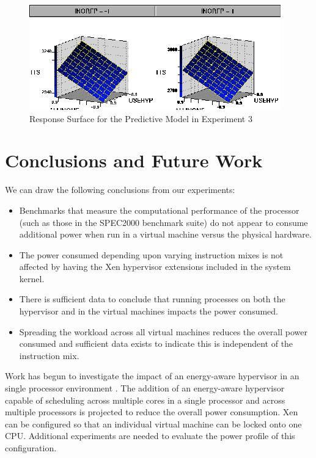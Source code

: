 \documentclass[preprint]{sigplanconf}
\begin{document}
\begin{figure}
  \centering
  \begin{center}
    \includegraphics[scale=2.0]{graphics/surfaceplot.eps}
  \end{center}
  \caption{Response Surface for the Predictive Model in Experiment 3}
  \label{fig:RSM3}
\end{figure}

\section{Conclusions and Future Work}
\label{sec:Conclusions}

We can draw the following conclusions from our experiments:
\begin{itemize}
\item Benchmarks that measure the computational performance of the processor
  (such as those in the SPEC2000 benchmark suite) do not appear to consume
  additional power when run in a virtual machine versus the physical hardware.
\item The power consumed depending upon varying instruction mixes is not
  affected by having the Xen hypervisor extensions included in the system kernel.
\item There is sufficient data to conclude that running processes on both the
  hypervisor and in the virtual machines impacts the power consumed.
\item Spreading the workload across all virtual machines reduces the overall
  power consumed and sufficient data exists to indicate this is independent of
  the instruction mix.
\end{itemize}

Work has begun to investigate the impact of an energy-aware hypervisor in
an single processor environment \cite{Reinhardt2005}.  The addition of an
energy-aware hypervisor capable of scheduling across multiple cores in a
single processor and across multiple processors is projected to reduce the
overall power consumption. Xen can be configured so that an individual virtual
machine can be locked onto one CPU.  Additional experiments are needed to
evaluate the power profile of this configuration.
\end{document}
